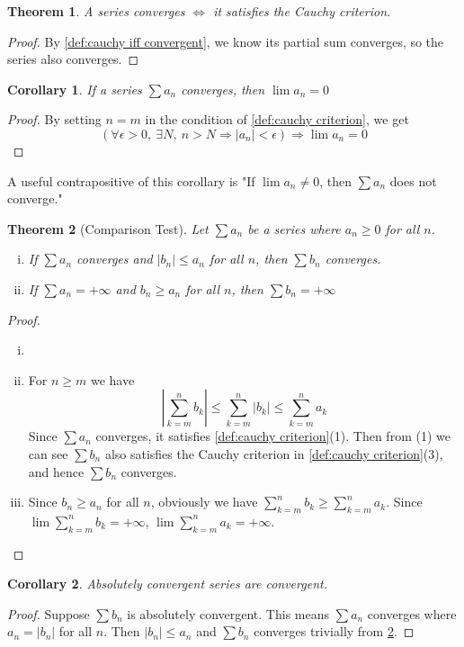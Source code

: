 \documentclass[12pt, lettersize]{book}
\theoremstyle{plain}
\newtheorem{thm}{Theorem}[section]
\newtheorem{cor}{Corollary}[thm]
\theoremstyle{definition}
\theoremstyle{remark}
\begin{document}
	\begin{thm}
		A series converges $\iff$ it satisfies the Cauchy criterion. 
	\end{thm}
	\begin{proof}
		By \ref{def:cauchy iff convergent}, we know its partial sum converges, so the series also converges.
	\end{proof}
	\begin{cor}\label{def:If a_n converges then lim(a_n)=0}
		If a series $\sum a_n$ converges, then $\lim a_n=0$
	\end{cor}
	\begin{proof}
		By setting $n=m$ in the condition of \ref{def:cauchy criterion}, we get
		\begin{displaymath}
			\left(\forall\epsilon>0,\ \exists N,\ n>N\Rightarrow\left|a_n\right|<\epsilon\right)\Rightarrow\lim a_n=0
		\end{displaymath}
	\end{proof}
	A useful contrapositive of this corollary is "If $\lim a_n\neq0$, then $\sum a_n$ does not converge."
	
	\setcounter{equation}{0}
	\begin{thm}[Comparison Test]\label{def:Comparison Test}
		Let $\sum a_n$ be a series where $a_n\geq0$ for all $n$.
		\begin{enumerate}[(i)]
			\item If $\sum a_n$ converges and $|b_n|\leq a_n$ for all $n$, then $\sum b_n$ converges.
			\item If $\sum a_n=+\infty$ and $b_n\geq a_n$ for all $n$, then $\sum b_n=+\infty$
		\end{enumerate}
	\end{thm}
	\begin{proof}
		\begin{enumerate}[(i)]
			\item[]
			\item For $n\geq m$ we have
			\begin{equation}
				\left|\sum_{k=m}^{n}b_k\right|\leq\sum_{k=m}^{n}|b_k|\leq\sum_{k=m}^{n}a_k
			\end{equation} 
			Since $\sum a_n$ converges, it satisfies \ref{def:cauchy criterion}(1). Then from (1)  we can see $\sum b_n$
			also satisfies the Cauchy criterion in \ref{def:cauchy criterion}(3), and hence $\sum b_n$ converges.
			\item Since $b_n\geq a_n$ for all $n$, obviously we have $\sum_{k=m}^{n}b_k\geq\sum_{k=m}^{n}a_k$. Since $\lim\sum_{k=m}^{n}b_k=+\infty$, $\lim\sum_{k=m}^{n}a_k=+\infty$.			
		\end{enumerate}
	\end{proof}
	\begin{cor}
		Absolutely convergent series are convergent.
	\end{cor}
	\begin{proof}
		Suppose $\sum b_n$ is absolutely convergent. This means $\sum a_n$ converges where $a_n=|b_n|$ for all $n$. Then
		$|b_n|\leq a_n$ and $\sum b_n$ converges trivially from \ref{def:Comparison Test}.
	\end{proof}
	
\end{document}
